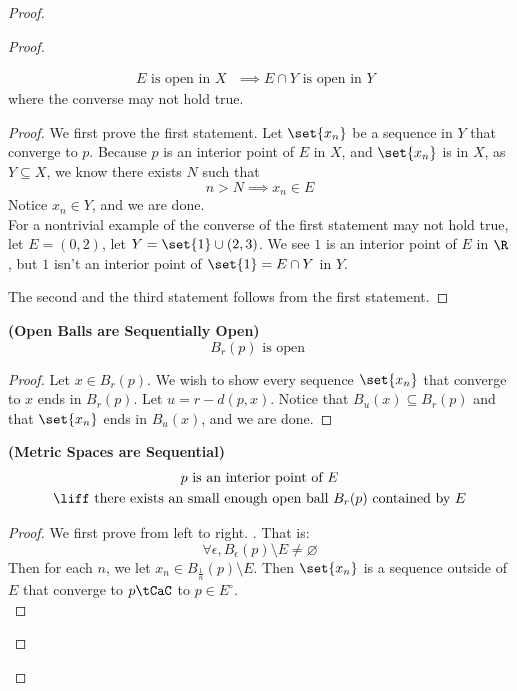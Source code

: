 \documentclass{report}
\begin{document}
\begin{proof}
\begin{proof}
\begin{theorem}
\begin{gather}
E\text{ is open in $X$ }\implies E\cap Y\text{ is open in $Y$ }
\end{gather}
where the converse may not hold true.
\end{theorem}
\begin{proof}
We first prove the first statement. Let $\set{x_n}$ be a sequence in $Y$ that converge to $p$. Because  $p$ is an interior point of  $E$ in  $X$, and  $\set{x_n}$ is in $X$, as  $Y\subseteq X$, we know there exists $N$ such that 
 \begin{equation}
n>N\implies x_n\in E
\end{equation}
Notice $x_n\in Y$, and we are done.\\

For a nontrivial example of the converse of the first statement may not hold true, let $E=(0,2)$, let $Y=\set{1}\cup (2,3)$. We see $1$ is an interior point of  $E$ in  $\R$, but  $1$ isn't an interior point of  $\set{1}=E\cap Y$ in $Y$.

The second and the third statement follows from the first statement. 
\end{proof}
\begin{theorem}
\label{3.3.9}
  \textbf{(Open Balls are Sequentially Open)} 
  \begin{equation}
  B_r(p)\text{ is open }
  \end{equation}
\end{theorem}
\begin{proof}
Let $x\in B_r(p)$. We wish to show every sequence $\set{x_n}$ that converge to $x$ ends in  $B_r(p)$. Let $u=r-d(p,x)$. Notice that $B_u(x)\subseteq B_r(p)$ and that $\set{x_n}$ ends in $B_u(x)$, and we are done.
\end{proof}
\begin{theorem}
\label{3.3.10}
\textbf{(Metric Spaces are Sequential)} 
\begin{gather}
\text{ $p$ is an interior point of $E$ }\\
\liff \text{ there exists an small enough open ball $B_r(p)$ contained by $E$}
\end{gather}
\end{theorem}
\begin{proof}
We first prove from left to right. . That is:
\begin{equation}
\forall \epsilon, B_\epsilon (p)\setminus E\neq \varnothing
\end{equation}
Then for each $n$, we let  $x_n\in B_{\frac{1}{n}}(p)\setminus E$. Then $\set{x_n}$ is a sequence outside of $E$ that converge to  $p\tCaC$ to $p\in E^\circ $.\\


\end{proof}
\end{proof}
\end{proof}
\end{document}
